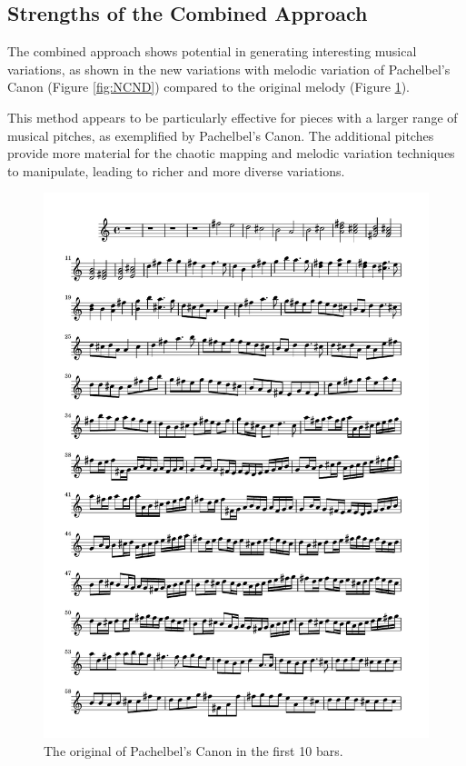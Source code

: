 \documentclass[11pt]{article}
\theoremstyle{definition}
\begin{document}
\subsection{Strengths of the Combined Approach}

The combined approach shows potential in generating interesting musical variations, as shown in the new variations with melodic variation of Pachelbel's Canon \cite{pachelbel_canon_2005} (Figure \ref{fig:NCND}) compared to the original melody (Figure \ref{fig:OCND}).

This method appears to be particularly effective for pieces with a larger range of musical pitches, as exemplified by Pachelbel's Canon. The additional pitches provide more material for the chaotic mapping and melodic variation techniques to manipulate, leading to richer and more diverse variations.

\begin{figure}
\centering
\includegraphics[trim=1cm 26.5cm 1cm 0.5cm, clip, scale=0.6]{Original_CND.pdf}
\caption{The original of Pachelbel's Canon in the first 10 bars.} 
\label{fig:OCND}
\end{figure}
\end{document}
